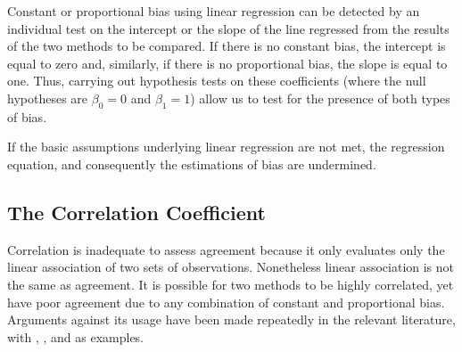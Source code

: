 \documentclass[12pt, a4paper]{report}
\theoremstyle{plain}
\theoremstyle{definition}
\theoremstyle{remark}
\begin{document}
	Constant or proportional bias using linear regression can be detected by an individual test on the intercept or the slope of the line regressed from the results of the two methods to be compared. If there is no constant bias, the intercept is equal to zero and, similarly, if there is no proportional bias, the slope is equal to one. Thus, carrying out hypothesis tests on these coefficients (where the null hypotheses are $\beta_0=0$ and $\beta_1=1$) allow us to test for the presence of both types of bias.

	
		If the basic assumptions underlying linear regression are not met, the regression equation, and consequently the estimations of bias are undermined. 
		
	\subsection*{The Correlation Coefficient}
	
Correlation is inadequate to assess agreement because it only evaluates only the linear association of two sets of observations.  Nonetheless linear association is not the same as agreement. It is possible for two methods to
be highly correlated, yet have poor agreement due to any combination of constant and proportional bias. Arguments against its usage have been made repeatedly in the relevant literature,  with \citet{BA83}, \citet{BA86}, \citet{BA2003} and \citet{giavarina2015understanding} as examples.
%	
%	
%		
%	
%	
%	
%	
	
\end{document}

